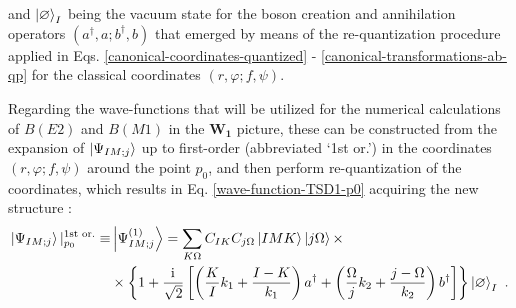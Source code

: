 and $\ket{\varnothing}_I$ being the vacuum state for the boson creation and annihilation operators $(a^\dagger,a;b^\dagger,b)$ that emerged by means of the re-quantization procedure applied in Eqs. \ref{canonical-coordinates-quantized} - \ref{canonical-transformations-ab-qp} for the classical coordinates $(r,\varphi;f,\psi)$.

Regarding the wave-functions that will be utilized for the numerical calculations of $B(E2)$ and $B(M1)$ in the $\mathbf{W_1}$ picture, these can be constructed from the expansion of $\ket{\Psi_{IM;j}}$ up to first-order (abbreviated `1st or.') in the coordinates $(r,\varphi;f,\psi)$ around the point $p_0$, and then perform re-quantization of the coordinates, which results in Eq. \ref{wave-function-TSD1-p0} acquiring the new structure \cite{raduta2017semiclassical,raduta2020approach,raduta2020towards}:
\begin{align}
    \ket{\Psi_{IM;j}}|_{p_0}^{\text{1st or.}}\equiv&\ket{\Psi_{IM;j}^{(1)}}=\sum_{K\Omega}C_{IK}C_{j\Omega}\ket{IMK}\ket{j\Omega}\times\nonumber\\
                           &\times\left\{1+\frac{\iu}{\sqrt{2}}\left[\left(\frac{K}{I}k_1+\frac{I-K}{k_1}\right)a^\dagger+\left(\frac{\Omega}{j}k_2+\frac{j-\Omega}{k_2}\right)b^\dagger\right]\right\}\ket{\varnothing}_I\ .
    \label{wave-function-TSD1-p0-first-order}
\end{align}

